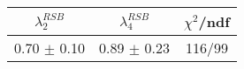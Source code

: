 \begin{tabular}{c|c||c}
$\lambda_{2}^{RSB}$ & $\lambda_4^{RSB}$ & $\chi^{2}$/ndf \\
\hline
0.70 $\pm$ 0.10 & 0.89 $\pm$ 0.23 & 116/99\\
\end{tabular}
